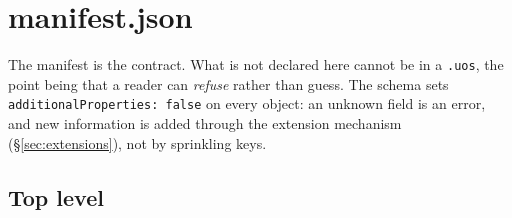 \documentclass[11pt,a4paper]{article}
\newcommand{\code}[1]{\texttt{\small #1}}
\begin{document}
\section{manifest.json}\label{sec:manifest}

The manifest is the contract. What is not declared here cannot be in a \code{.uos}, the
point being that a reader can \emph{refuse} rather than guess. The schema sets
\code{additionalProperties: false} on every object: an unknown field is an error, and new
information is added through the extension mechanism (\S\ref{sec:extensions}), not by
sprinkling keys.

\subsection{Top level}
\end{document}
